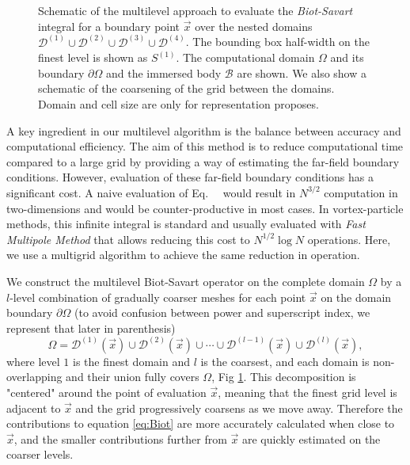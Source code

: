 \documentclass{article}
\begin{document}
\begin{figure}
    \centering
    \def\svgwidth{0.8\columnwidth}
    
    \caption{Schematic of the multilevel approach to evaluate the \emph{Biot-Savart} integral for a boundary point $\vec x$ over the nested domains $\mathcal{D}^{(1)} \cup \mathcal{D}^{(2)} \cup \mathcal{D}^{(3)} \cup \mathcal{D}^{(4)}$. The bounding box half-width on the finest level is shown as ${S}^{(1)}$. The computational domain $\Omega$ and its boundary $\partial\Omega$ and the immersed body $\mathcal{B}$ are shown. We also show a schematic of the coarsening of the grid between the domains. Domain and cell size are only for representation proposes.}
    \label{Fig_2}
\end{figure}

A key ingredient in our multilevel algorithm is the balance between accuracy and computational efficiency. The aim of this method is to reduce computational time compared to a large grid by providing a way of estimating the far-field boundary conditions. However, evaluation of these far-field boundary conditions has a significant cost. A naive evaluation of Eq.~\theequation~ would result in $N^{3/2}$ computation in two-dimensions and would be counter-productive in most cases. In vortex-particle methods, this infinite integral is standard and usually evaluated with \emph{Fast Multipole Method} that allows reducing this cost to $N^{1/2}\log N$ operations. Here, we use a multigrid algorithm to achieve the same reduction in operation.


We construct the multilevel Biot-Savart operator on the complete domain $\Omega$ by a $l$-level combination of gradually coarser meshes for each point $\vec x$ on the domain boundary $\partial \Omega$ (to avoid confusion between power and superscript index, we represent that later in parenthesis)
\begin{equation}\label{eq:multilevel}
    \Omega = \mathcal{D}^{(1)}(\vec x) \cup \mathcal{D}^{(2)}(\vec x) \cup \cdots \cup \mathcal{D}^{(l-1)}(\vec x) \cup \mathcal{D}^{(l)}(\vec x),
\end{equation}
where level $1$ is the finest domain and $l$ is the coarsest, and each domain is non-overlapping and their union fully covers $\Omega$, Fig \ref{Fig_2}. This decomposition is "centered" around the point of evaluation $\vec x$, meaning that the finest grid level is adjacent to $\vec x$ and the grid progressively coarsens as we move away. Therefore the contributions to equation \ref{eq:Biot} are more accurately calculated when close to $\vec x$, and the smaller contributions further from $\vec x$ are quickly estimated on the coarser levels.
\end{document}
